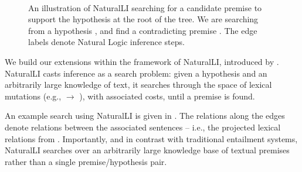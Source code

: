 
%
%

\begin{figure}[t]
\begin{center}
  \resizebox{0.48\textwidth}{!}{\teaserSearch} \\
\end{center}
{
  An illustration of NaturalLI searching for a candidate premise
  to support the hypothesis at the root of the tree.
  We are searching from a hypothesis
  , and find a contradicting
  premise .
  The edge labels denote Natural Logic inference steps.
  \label{fig:naturalli}
}
\end{figure}

We build our extensions within the framework of NaturalLI, introduced
  by .
NaturalLI casts inference as a search problem: given a hypothesis and an arbitrarily
  large knowledge of text, it searches through the space of
  lexical mutations (e.g.,  $\rightarrow$ ), 
  with associated costs, until a premise is found.

An example search using NaturalLI is given in .
The relations along the edges denote relations between the associated sentences
  -- i.e., the projected lexical relations from .
Importantly, and in contrast with traditional entailment systems, NaturalLI
  searches over an arbitrarily large knowledge base of textual premises rather
  than a single premise/hypothesis pair.

